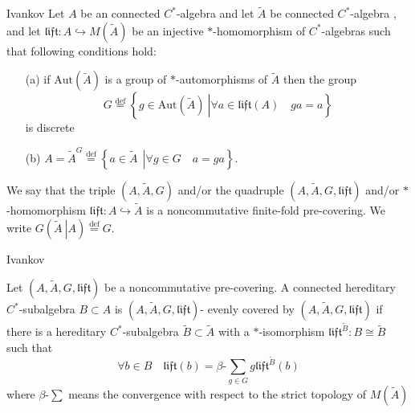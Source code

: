 \documentclass{beamer}
\theoremstyle{plain}
\newcommand{\be}{\begin{equation}}
\newcommand{\ee}{\end{equation}}
\newcommand{\lift}{\mathfrak{lift}}
\newcommand{\Aut}{\mathrm{Aut}}
\newcommand{\bt}{\beta}           %
\newcommand{\bydef}{\stackrel{\mathrm{def}}{=}}
\newcommand{\hookto}{\hookrightarrow}        %
\begin{document}
\begin{frame}

\begin{definition}\label{fin_pre_defn}\alert{Ivankov}
	Let   $A$ be an  connected $C^*$-algebra  and let  $\widetilde{A}$ be  connected $C^*$-algebra , and let $\lift: A \hookto M\left( \widetilde{A}\right) $ be an injective  $*$-homomorphism of %
	$C^*$-algebras such that following conditions hold:
	\begin{enumerate}
		\item[(a)] if $\Aut\left(\widetilde{A} \right)$ is a group of $*$-automorphisms of $\widetilde{A}$ then the group  
		\be\nonumber
		G \bydef \left\{ \left.g \in \Aut\left(\widetilde{A} \right)~\right|\forall a \in \lift \left( A\right) \quad ga = a\right\}
		\ee
		is discrete
		\item[(b)] 	$A = \widetilde{A}^G\stackrel{\text{def}}{=}\left\{\left.a\in \widetilde{A}~~\right|\forall g \in G\quad  a = g a\right\}$.
	\end{enumerate}
	We say that the triple $\left(A, \widetilde{A}, G \right)$ and/or the quadruple $\left(A, \widetilde{A}, G, \lift \right)$ and/or $*$-homomorphism $\lift: A \hookto \widetilde{A}$   is a \alert{noncommutative finite-fold  pre-covering}. We write $G\left(\left.\widetilde A~\right|A \right)\bydef G$.
\end{definition}
\end{frame}
\begin{frame}

\begin{definition}\label{evenly_defn}\alert{Ivankov}
	
	Let $\left(A, \widetilde{A}, G, \lift \right)$ be a noncommutative  pre-covering.	A connected hereditary $C^*$-subalgebra $B \subset A$ 
	is $\left(A, \widetilde{A}, G, \lift \right)$- \alert{evenly covered by} $\left(A, \widetilde{A}, G, \lift \right)$ if there is a hereditary $C^*$-subalgebra $\widetilde B \subset \widetilde A$ with a $*$-isomorphism $\lift^{\widetilde B}: B \cong \widetilde B$ such that
	\be\label{evenly_eqn}
	\forall b \in B \quad \lift\left( b\right) = \bt \text{-}\sum_{g\in G} g \lift^{\widetilde B}\left( b\right) 
	\ee
	where $\bt \text{-}\sum$ means the convergence with respect to the strict topology of $M\left( \widetilde A\right)$
\end{definition}
\end{frame}
\end{document}
